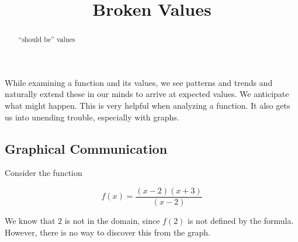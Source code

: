 \documentclass{ximera}
\title{Broken Values}
\begin{document}
\begin{abstract}
``should be'' values
\end{abstract}
\maketitle






While examining a function and its values, we see patterns and trends and naturally extend these in our minds to arrive at expected values. We anticipate what might happen.  This is very helpful when analyzing a function. It also gets us into unending trouble, especially with graphs.






\subsection*{Graphical Communication}


Consider the function 

\[ f(x) = \frac{(x-2)(x+3)}{(x-2)} \]

We know that $2$ is not in the domain, since $f(2)$ is not defined  by the formula.  However, there is no way to discover this from the graph.



\begin{image}
\end{image}
\end{document}
